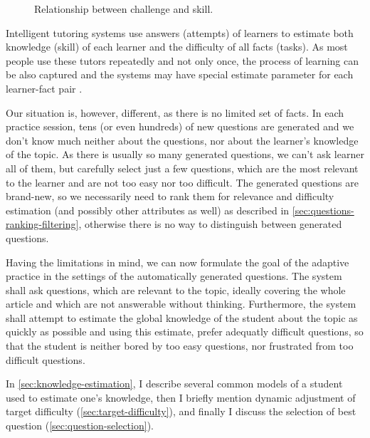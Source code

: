 \documentclass[a4paper, 12pt, twoside]{fithesis2}		%
\renewcommand{\_}{\leavevmode \kern0.07em\vbox{\hrule width0.4em}}
\begin{document}
\begin{figure}[h]
  \centering
  \caption{Relationship between challenge and skill.}
  \label{fig:flow}
\end{figure}

Intelligent tutoring systems use answers (attempts) of learners to estimate both knowledge (skill) of each learner and the difficulty of all facts (tasks).
As most people use these tutors repeatedly and not only once, the process of learning can be also captured
and the systems may have special estimate parameter for each learner-fact pair \cite{slepe-mapy}.

Our situation is, however, different, as there is no limited set of facts.
In each practice session, tens (or even hundreds) of new questions are generated
and we don't know much neither about the questions, nor about the learner's knowledge of the topic.
As there is usually so many generated questions, we can't ask learner all of them,
but carefully select just a few questions, which are the most relevant to the learner and are not too easy nor too difficult.
The generated questions are brand-new, so we necessarily need to rank them for relevance and difficulty estimation (and possibly other attributes as well) as described in \autoref{sec:questions-ranking-filtering},
otherwise there is no way to distinguish between generated questions.

Having the limitations in mind, we can now formulate the goal of the adaptive practice in the settings of the automatically generated questions.
The system shall ask questions, which are relevant to the topic, ideally covering the whole article and which are not answerable without thinking. Furthermore, the system shall attempt to estimate the global knowledge of the student about the topic as quickly as possible and using this estimate, prefer adequatly difficult questions, so that the student is neither bored by too easy questions, nor frustrated from too difficult questions.

In \autoref{sec:knowledge-estimation}, I describe several common models of a student used to estimate one's knowledge, then I briefly mention dynamic adjustment of target difficulty (\autoref{sec:target-difficulty}),
and finally I discuss the selection of best question (\autoref{sec:question-selection}).
\end{document}
